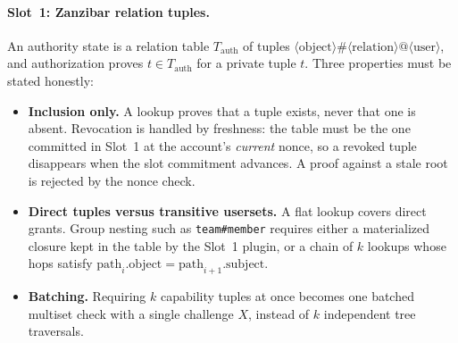 \documentclass[a4paper,11pt,twoside,parskip=half-,headings=small]{scrartcl}
\newcommand{\code}[1]{\texttt{#1}}
\begin{document}
\paragraph{Slot~1: Zanzibar relation tuples.}
An authority state is a relation table $T_{\text{auth}}$ of tuples $\langle\text{object}\rangle \# \langle\text{relation}\rangle @ \langle\text{user}\rangle$, and authorization proves $t \in T_{\text{auth}}$ for a private tuple $t$. Three properties must be stated honestly:
\begin{itemize}[nosep]
  \item \textbf{Inclusion only.} A lookup proves that a tuple exists, never that one is absent. Revocation is handled by freshness: the table must be the one committed in Slot~1 at the account's \emph{current} nonce, so a revoked tuple disappears when the slot commitment advances. A proof against a stale root is rejected by the nonce check.
  \item \textbf{Direct tuples versus transitive usersets.} A flat lookup covers direct grants. Group nesting such as \code{team\#member} requires either a materialized closure kept in the table by the Slot~1 plugin, or a chain of $k$ lookups whose hops satisfy $\text{path}_i.\text{object} = \text{path}_{i+1}.\text{subject}$.
  \item \textbf{Batching.} Requiring $k$ capability tuples at once becomes one batched multiset check with a single challenge $X$, instead of $k$ independent tree traversals.
\end{itemize}
\end{document}
